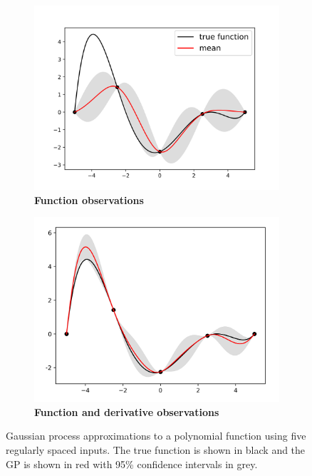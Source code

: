 \documentclass{article}
\numberwithin{equation}{section}
\begin{document}
\begin{figure}
		\centering
		\captionsetup{justification=centering}
    \begin{subfigure}[b]{.5\textwidth}
      \centering
      \includegraphics[scale=0.38]{figures/smooth-noder.png}
      \caption{\textbf{Function observations}}
    \end{subfigure}%
    \begin{subfigure}[b]{.5\textwidth}
      \centering
      \includegraphics[scale=1.2]{figures/smooth-der.png}
      \caption{\textbf{Function and derivative observations}}
    \end{subfigure}
		\caption{Gaussian process approximations to a polynomial function using five regularly spaced inputs. The true function is shown in black and the GP is shown in red with 95\% confidence intervals in grey.}
		\label{smooth}
\end{figure}
\end{document}
